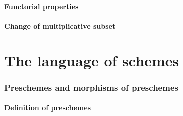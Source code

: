 \documentclass[10pt,oneside]{amsart}
\begin{document}
        \subsection{Functorial properties}
        

        \subsection{Change of multiplicative subset}
        

\clearpage


\part{The language of schemes}

    \section{Preschemes and morphisms of preschemes}

        \subsection{Definition of preschemes}
        
\end{document}
